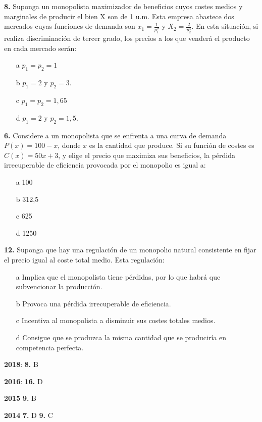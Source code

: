 \documentclass{nuevotema}
\begin{document}
\textbf{8.} Suponga un monopolista maximizador de beneficios cuyos costes medios y marginales de producir el bien X son de 1 u.m. Esta empresa abastece dos mercados cuyas funciones de demanda son $x_1 = \frac{1}{p_1^2}$ y $X_2 = \frac{2}{p_2^3}$. En esta situación, si realiza discriminación de tercer grado, los precios a los que venderá el producto en cada mercado serán:

\begin{itemize}
	\item[a] $p_1 = p_2 = 1$
	\item[b] $p_1 = 2$ y $p_2=3$.
	\item[c] $p_1 = p_2 = 1,65$
	\item[d] $p_1 = 2$ y $p_2=1,5$.
\end{itemize}

\textbf{6.} Considere a un monopolista que se enfrenta a una curva de demanda $P(x) = 100 -x$, donde $x$ es la cantidad que produce. Si su función de costes es $C(x) = 50x + 3$, y elige el precio que maximiza sus beneficios, la pérdida irrecuperable de eficiencia provocada por el monopolio es igual a:
\begin{enumerate}
	\item[a] 100
	\item[b] 312,5
	\item[c] 625
	\item[d] 1250
\end{enumerate}

\textbf{12.} Suponga que hay una regulación de un monopolio natural consistente en fijar el precio igual al coste total medio. Esta regulación:
\begin{enumerate}
	\item[a] Implica que el monopolista tiene pérdidas, por lo que habrá que subvencionar la producción.
	\item[b] Provoca una pérdida irrecuperable de eficiencia.
	\item[c] Incentiva al monopolista a disminuir sus costes totales medios.
	\item[d] Consigue que se produzca la misma cantidad que se produciría en competencia perfecta.
\end{enumerate}

\notas

\textbf{2018}: \textbf{8.} B

\textbf{2016}: \textbf{16.} D

\textbf{2015} \textbf{9.} B

\textbf{2014} \textbf{7.} D \textbf{9.} C
\end{document}
